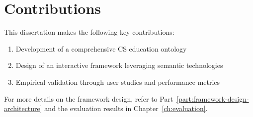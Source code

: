 \vspace{1em}

\section{Contributions}

This dissertation makes the following key contributions:

\begin{enumerate}
    \item Development of a comprehensive CS education ontology
    \item Design of an interactive framework leveraging semantic technologies
    \item Empirical validation through user studies and performance metrics
\end{enumerate}

For more details on the framework design, refer to Part~\ref{part:framework-design-architecture} and the evaluation results in Chapter~\ref{ch:evaluation}.
